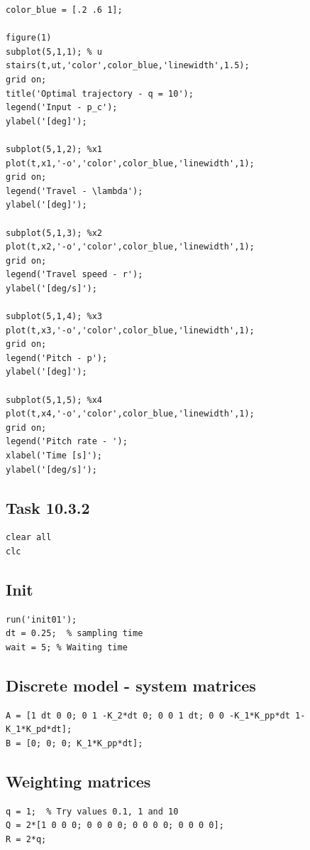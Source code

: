 \documentclass[11pt,a4paper,USenglish]{article} %
\begin{document}
\begin{verbatim}
color_blue = [.2 .6 1];

figure(1)
subplot(5,1,1); % u
stairs(t,ut,'color',color_blue,'linewidth',1.5);
grid on;
title('Optimal trajectory - q = 10');
legend('Input - p_c');
ylabel('[deg]');

subplot(5,1,2); %x1
plot(t,x1,'-o','color',color_blue,'linewidth',1);
grid on;
legend('Travel - \lambda');
ylabel('[deg]');

subplot(5,1,3); %x2
plot(t,x2,'-o','color',color_blue,'linewidth',1);
grid on;
legend('Travel speed - r');
ylabel('[deg/s]');

subplot(5,1,4); %x3
plot(t,x3,'-o','color',color_blue,'linewidth',1);
grid on;
legend('Pitch - p');
ylabel('[deg]');

subplot(5,1,5); %x4
plot(t,x4,'-o','color',color_blue,'linewidth',1);
grid on;
legend('Pitch rate - ');
xlabel('Time [s]');
ylabel('[deg/s]');
\end{verbatim}

\subsection{Task 10.3.2}
\begin{verbatim}
clear all
clc
\end{verbatim}


\subsection*{Init}

\begin{verbatim}
run('init01');
dt = 0.25;  % sampling time
wait = 5; % Waiting time
\end{verbatim}


\subsection*{Discrete model - system matrices}

\begin{verbatim}
A = [1 dt 0 0; 0 1 -K_2*dt 0; 0 0 1 dt; 0 0 -K_1*K_pp*dt 1-K_1*K_pd*dt];
B = [0; 0; 0; K_1*K_pp*dt];
\end{verbatim}


\subsection*{Weighting matrices}

\begin{verbatim}
q = 1;  % Try values 0.1, 1 and 10
Q = 2*[1 0 0 0; 0 0 0 0; 0 0 0 0; 0 0 0 0];
R = 2*q;
\end{verbatim}
\end{document}
